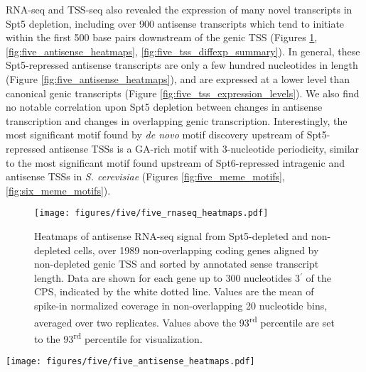 RNA-seq and TSS-seq also revealed the expression of many novel transcripts in Spt5 depletion, including over 900 antisense transcripts which tend to initiate within the first 500 base pairs downstream of the genic TSS (Figures \ref{fig:five_rnaseq_heatmaps}, \ref{fig:five_antisense_heatmaps}, \ref{fig:five_tss_diffexp_summary}).
In general, these Spt5-repressed antisense transcripts are only a few hundred nucleotides in length (Figure \ref{fig:five_antisense_heatmaps}), and are expressed at a lower level than canonical genic transcripts (Figure \ref{fig:five_tss_expression_levels}).
We also find no notable correlation upon Spt5 depletion between changes in antisense transcription and changes in overlapping genic transcription.
Interestingly, the most significant motif found by \textit{de novo} motif discovery upstream of Spt5-repressed antisense TSSs is a GA-rich motif with 3-nucleotide periodicity, similar to the most significant motif found upstream of Spt6-repressed intragenic and antisense TSSs in \textit{S. cerevisiae} (Figures \ref{fig:five_meme_motifs}, \ref{fig:six_meme_motifs}).
\begin{figure}[h]
    \centering
    \texttt{[image: figures/five/five\_rnaseq\_heatmaps.pdf]}
    \caption[Heatmaps of antisense RNA-seq signal from Spt5-depleted and non-depleted cells, over non-overlapping coding genes.]{Heatmaps of antisense RNA-seq signal from Spt5-depleted and non-depleted cells, over 1989 non-overlapping coding genes aligned by non-depleted genic TSS and sorted by annotated sense transcript length. Data are shown for each gene up to 300 nucleotides 3$^\prime$ of the CPS, indicated by the white dotted line. Values are the mean of spike-in normalized coverage in non-overlapping 20 nucleotide bins, averaged over two replicates. Values above the 93\textsuperscript{rd} percentile are set to the 93\textsuperscript{rd} percentile for visualization.}
    \label{fig:five_rnaseq_heatmaps}
\end{figure}

\clearpage

\begin{sidewaysfigure}
    \centering
    \texttt{[image: figures/five/five\_antisense\_heatmaps.pdf]}
    \caption[Heatmaps of antisense TSS-seq, RNA-seq, and NET-seq signal from Spt5-depleted and non-depleted cells, for genes with Spt5-depletion-induced antisense TSSs.]{Heatmaps of antisense TSS-seq, RNA-seq, and NET-seq signal in Spt5 non-depleted and depleted cells, for all genes overlapping an Spt5-depletion-induced antisense TSS. Genes are aligned by the sense, genic TSS and sorted by the distance from the genic TSS to the antisense TSS. Values are the mean of spike-in normalized coverage in non-overlapping 20 nt bins, over one (non-depleted NET-seq) or more experiments. Values above the 0.995 (TSS-seq), 0.98 (RNA-seq), or 0.96 (NET-seq) quantiles are set to their respective quantiles for visualization.}
    \label{fig:five_antisense_heatmaps}
\end{sidewaysfigure}

